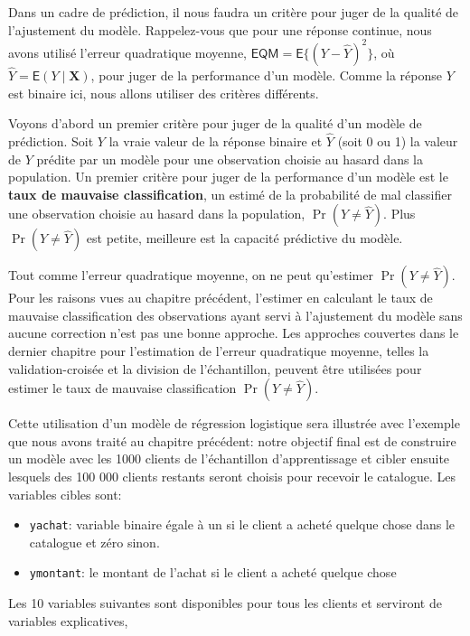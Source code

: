 \documentclass[
  11pt,
  letterpaper,
]{book}
\providecommand{\tightlist}{%
  \setlength{\itemsep}{0pt}\setlength{\parskip}{0pt}}\usepackage{longtable,booktabs,array}
\theoremstyle{definition}
\theoremstyle{remark}
\begin{document}
Dans un cadre de prédiction, il nous faudra un critère pour juger de la
qualité de l'ajustement du modèle. Rappelez-vous que pour une réponse
continue, nous avons utilisé l'erreur quadratique moyenne,
\(\mathsf{EQM} = \mathsf{E}\{(Y-\widehat{Y})^2\}\), où
\(\widehat{Y} = \mathsf{E}(Y \mid \mathbf{X})\), pour juger de la
performance d'un modèle. Comme la réponse \(Y\) est binaire ici, nous
allons utiliser des critères différents.

Voyons d'abord un premier critère pour juger de la qualité d'un modèle
de prédiction. Soit \(Y\) la vraie valeur de la réponse binaire et
\(\widehat{Y}\) (soit 0 ou 1) la valeur de \(Y\) prédite par un modèle
pour une observation choisie au hasard dans la population. Un premier
critère pour juger de la performance d'un modèle est le \textbf{taux de
mauvaise classification}, un estimé de la probabilité de mal classifier
une observation choisie au hasard dans la population,
\(\Pr(Y \neq\widehat{Y})\). Plus \(\Pr(Y \neq\widehat{Y})\) est petite,
meilleure est la capacité prédictive du modèle.

Tout comme l'erreur quadratique moyenne, on ne peut qu'estimer
\(\Pr(Y \neq\widehat{Y})\). Pour les raisons vues au chapitre précédent,
l'estimer en calculant le taux de mauvaise classification des
observations ayant servi à l'ajustement du modèle sans aucune correction
n'est pas une bonne approche. Les approches couvertes dans le dernier
chapitre pour l'estimation de l'erreur quadratique moyenne, telles la
validation-croisée et la division de l'échantillon, peuvent être
utilisées pour estimer le taux de mauvaise classification
\(\Pr(Y \neq \widehat{Y})\).

Cette utilisation d'un modèle de régression logistique sera illustrée
avec l'exemple que nous avons traité au chapitre précédent: notre
objectif final est de construire un modèle avec les 1000 clients de
l'échantillon d'apprentissage et cibler ensuite lesquels des 100 000
clients restants seront choisis pour recevoir le catalogue. Les
variables cibles sont:

\begin{itemize}
\tightlist
\item
  \texttt{yachat}: variable binaire égale à un si le client a acheté
  quelque chose dans le catalogue et zéro sinon.
\item
  \texttt{ymontant}: le montant de l'achat si le client a acheté quelque
  chose
\end{itemize}

Les 10 variables suivantes sont disponibles pour tous les clients et
serviront de variables explicatives,
\end{document}
